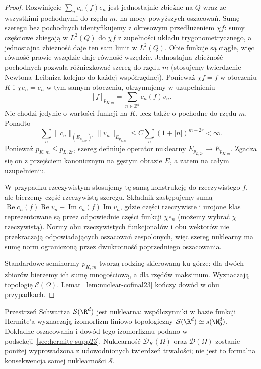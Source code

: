 \begin{proof}
Rozwinięcie $\sum_n c_n(f)e_n$ jest jednostajnie
zbieżne na $Q$ wraz ze wszystkimi pochodnymi do rzędu
$m$, na mocy powyższych oszacowań.
Sumę szeregu bez pochodnych identyfikujemy z okresowym
przedłużeniem $\chi f$: sumy częściowe zbiegają
w $L^2(Q)$ do $\chi f$ z zupełności układu
trygonometrycznego, a jednostajna zbieżność daje
ten sam limit w $L^2(Q)$. Obie funkcje są ciągłe,
więc równość prawie wszędzie daje równość wszędzie.
Jednostajna zbieżność pochodnych pozwala różniczkować
szereg do rzędu $m$ (stosujemy twierdzenie
Newtona--Leibniza kolejno do każdej współrzędnej).
Ponieważ $\chi f=f$ w otoczeniu $K$ i $\chi e_n=e_n$
w tym samym otoczeniu, otrzymujemy w uzupełnieniu
\[
 [f]_{p_{K,m}}=\sum_{n\in\mathbb Z^d}c_n(f)v_n.
\]
Nie chodzi jedynie o wartości funkcji na $K$,
lecz także o pochodne do rzędu $m$.
Ponadto
\[
 \sum_n\|c_n\|_{(E_{p_{L,2r}})'}\|v_n\|_{E_{p_{K,m}}}
 \le C\sum_n(1+|n|)^{m-2r}<\infty.
\]
Ponieważ $p_{K,m}\le p_{L,2r}$, szereg definiuje
operator nuklearny $E_{p_{L,2r}}\to E_{p_{K,m}}$.
Zgadza się on z przejściem kanonicznym na gęstym
obrazie $E$, a zatem na całym uzupełnieniu.

W przypadku rzeczywistym stosujemy tę samą konstrukcję
do rzeczywistego $f$, ale bierzemy część rzeczywistą
szeregu. Składnik zastępujemy sumą
$\operatorname{Re}c_n(f)\operatorname{Re}v_n-
\operatorname{Im}c_n(f)\operatorname{Im}v_n$,
gdzie części rzeczywiste i urojone klas reprezentowane
są przez odpowiednie części funkcji $\chi e_n$
(możemy wybrać $\chi$ rzeczywistą).
Normy obu rzeczywistych funkcjonałów i obu wektorów
nie przekraczają odpowiadających oszacowań zespolonych,
więc szereg nuklearny ma sumę norm ograniczoną przez
dwukrotność poprzedniego oszacowania.

Standardowe seminormy $p_{K,m}$ tworzą rodzinę
skierowaną ku górze: dla dwóch zbiorów bierzemy
ich sumę mnogościową, a dla rzędów maksimum.
Wyznaczają topologię $\mathcal E(\Omega)$.
Lemat~\ref{lem:nuclear-cofinal23} kończy dowód
w obu przypadkach.
\end{proof}

\begin{uwaga}
\label{rem:hermite-nuclear23}
Przestrzeń Schwartza $\mathcal S(\R^d)$ jest nuklearna:
współczynniki w bazie funkcji Hermite'a wyznaczają
izomorfizm liniowo-topologiczny
$\mathcal S(\R^d)\simeq s(\N_0^d)$.
Dokładne oszacowania i dowód tego izomorfizmu podano
w podsekcji~\ref{sec:hermite-supp23}.
Nuklearność $\mathcal D_K(\Omega)$ oraz
$\mathcal D(\Omega)$ zostanie poniżej wyprowadzona
z udowodnionych twierdzeń trwałości; nie jest to
formalna konsekwencja samej nuklearności $\mathcal S$.
\end{uwaga}

